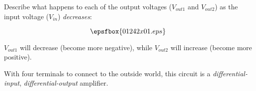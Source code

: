 

Describe what happens to each of the output voltages ($V_{out1}$ and $V_{out2}$) as the input voltage ($V_{in}$) {\it decreases}:

$$\epsfbox{01242x01.eps}$$







$V_{out1}$ will decrease (become more negative), while $V_{out2}$ will increase (become more positive).







With four terminals to connect to the outside world, this circuit is a {\it differential-input}, {\it differential-output} amplifier.




